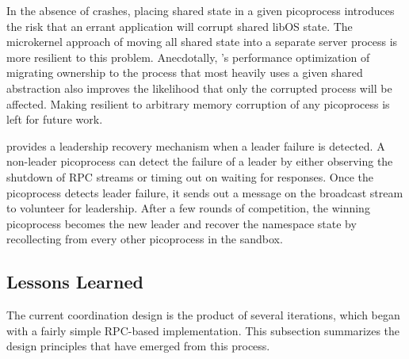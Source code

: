 In the absence of crashes, placing shared state in a given picoprocess introduces the risk that an errant 
application will corrupt shared libOS state.  The microkernel approach of 
moving all shared state into a separate server process is more resilient to this problem.
Anecdotally, \sysname{}'s performance optimization of migrating ownership to the process that 
most heavily uses a given shared abstraction also improves the likelihood that only the corrupted
process will be affected.  
Making \sysname{} resilient to arbitrary memory corruption of any picoprocess is left for future work.

\vspace{5pt}
\sysname{} provides a leadership recovery mechanism when a leader failure is detected.
A non-leader picoprocess can detect the failure of a leader by either observing the shutdown of RPC streams or timing out on waiting for responses. 
Once the picoprocess detects leader failure, it sends out a message on the broadcast stream to volunteer for leadership.
After a few rounds of competition, the winning picoprocess becomes the new leader and recover the namespace state by recollecting from every other picoprocess in the sandbox.



\subsection{Lessons Learned}
\label{sec:namespaces:insights}

The current coordination design is the product of several iterations, which began 
with a fairly simple RPC-based implementation. %
This subsection summarizes the design principles that have emerged from this process.

